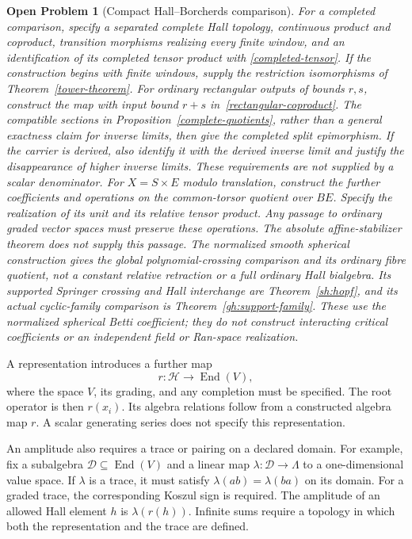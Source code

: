 \documentclass[11pt]{article}
\newtheorem{problem}[theorem]{Open Problem}
\begin{document}
\begin{problem}[Compact Hall--Borcherds comparison]
For a completed comparison, specify a separated complete Hall topology,
continuous product and coproduct, transition morphisms realizing every
finite window, and an identification of its completed tensor product with
\eqref{completed-tensor}. If the construction begins with finite windows,
supply the restriction isomorphisms of Theorem~\ref{tower-theorem}.
For ordinary rectangular outputs of bounds $r,s$, construct the map
with input bound $r+s$ in~\eqref{rectangular-coproduct}.
The compatible sections in
Proposition~\ref{complete-quotients}, rather than a general exactness claim
for inverse limits, then give the completed split epimorphism.  If the
carrier is derived, also identify it with the derived inverse limit and
justify the disappearance of higher inverse limits.  These requirements
are not supplied by a scalar denominator.
For $X=S\times E$ modulo translation, construct the further coefficients
and operations on the common-torsor quotient over $BE$.
Specify the realization of its unit and its relative tensor product.
Any passage to ordinary graded vector spaces must preserve these
operations. The absolute affine-stabilizer theorem does not supply
this passage. The normalized smooth spherical construction gives the
global polynomial-crossing comparison and its ordinary fibre quotient,
not a constant relative retraction or a full ordinary Hall bialgebra.
Its supported Springer crossing and Hall interchange are
Theorem~\ref{sh:hopf}, and its actual cyclic-family comparison is
Theorem~\ref{gh:support-family}. These use the normalized
spherical Betti coefficient; they do not construct interacting
critical coefficients or an independent field or Ran-space
realization.
\end{problem}

A representation introduces a further map
\[
 r:\mathcal H\longrightarrow\operatorname{End}(V),
\]
where the space $V$, its grading, and any completion must be specified.
The root operator is then $r(x_i)$.
Its algebra relations follow from a constructed algebra map $r$.
A scalar generating series does not specify this representation.

An amplitude also requires a trace or pairing on a declared domain.
For example, fix a subalgebra
$\mathcal D\subseteq\operatorname{End}(V)$ and a linear map
$\lambda:\mathcal D\to\Lambda$ to a one-dimensional value space.
If $\lambda$ is a trace, it must satisfy
$\lambda(ab)=\lambda(ba)$ on its domain.
For a graded trace, the corresponding Koszul sign is required.
The amplitude of an allowed Hall element $h$ is
$\lambda(r(h))$.
Infinite sums require a topology in which both the representation
and the trace are defined.
\end{document}
